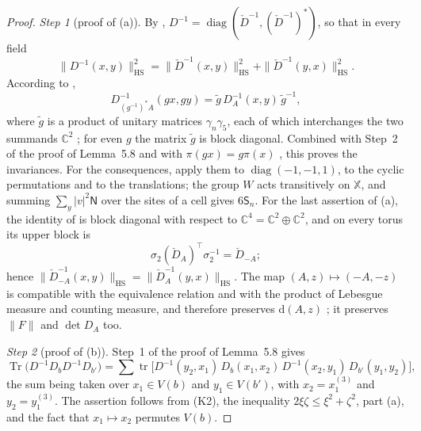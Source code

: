 \documentclass[11pt]{amsart}
\theoremstyle{definition}
\begin{document}
\begin{proof}
\emph{Step 1} (proof of (a)).
By \cite[Proposition~3.18\,(d)]{QEDII}, $D^{-1}=\operatorname{diag}(\check D^{-1},(\check D^{-1})^*)$, so that in every field
\begin{equation*}
\|D^{-1}(x,y)\|^2_{\mathrm{HS}}=\|\check D^{-1}(x,y)\|^2_{\mathrm{HS}}+\|\check D^{-1}(y,x)\|^2_{\mathrm{HS}}.
\end{equation*}
According to \cite[Proposition~3.16\,(b)]{QEDII},
\begin{equation*}
D^{-1}_{(g^{-1})^*A}(gx,gy)=\tilde g\,D_A^{-1}(x,y)\,\tilde g^{-1},
\end{equation*}
where $\tilde g$ is a product of unitary matrices $\gamma_n\gamma_5$, each of which interchanges the two summands $\mathbb C^2$ \cite[Definition~2.7]{QEDII}; for even $g$ the matrix $\tilde g$ is block diagonal.
Combined with Step~2 of the proof of Lemma~5.8 and with $\pi(gx)=g\pi(x)$ \cite[Proposition~3.6\,(c)]{QEDII}, this proves the invariances.
For the consequences, apply them to $\operatorname{diag}(-1,-1,1)$, to the cyclic permutations and to the translations; the group $W$ acts transitively on $\mathbb X$, and summing $\sum_y|v|^2\mathsf N$ over the sites of a cell gives $6\mathsf S_n$.
For the last assertion of (a), the identity of \cite[Proposition~3.16\,(c)]{QEDII} is block diagonal with respect to $\mathbb C^4=\mathbb C^2\oplus\mathbb C^2$, and on every torus its upper block is
\begin{equation*}
\sigma_2(\check D_A)^{\top}\sigma_2^{-1}=\check D_{-A};
\end{equation*}
hence $\|\check D_{-A}^{-1}(x,\allowbreak y)\|_{\mathrm{HS}}=\allowbreak \|\check D_A^{-1}(y,\allowbreak x)\|_{\mathrm{HS}}$.
The map $(A,z)\mapsto(-A,-z)$ is compatible with the equivalence relation and with the product of Lebesgue measure and counting measure, and therefore preserves $\mathrm d(A,z)$ \cite[Definition~2.6]{QEDII}; it preserves $\|F\|$ and $\det D_A$ too.

\emph{Step 2} (proof of (b)).
Step~1 of the proof of Lemma~5.8 gives
\begin{equation*}
\operatorname{Tr}\bigl(D^{-1}D_bD^{-1}D_{b'}\bigr)=\sum\operatorname{tr}\bigl[D^{-1}(y_2,x_1)\,D_b(x_1,x_2)\,D^{-1}(x_2,y_1)\,D_{b'}(y_1,y_2)\bigr],
\end{equation*}
the sum being taken over $x_1\in V(b)$ and $y_1\in V(b')$, with $x_2=x_1^{(3)}$ and $y_2=y_1^{(3)}$.
The assertion follows from (K2), the inequality $2\xi\zeta\le\xi^2+\zeta^2$, part (a), and the fact that $x_1\mapsto x_2$ permutes $V(b)$.


\end{proof}
\end{document}

